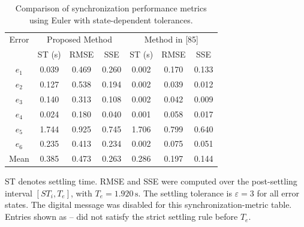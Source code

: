 \begin{table}[!t]
\centering
\caption{Comparison of synchronization performance metrics using Euler with state-dependent tolerances.}
\label{tab:t1_article_style_euler}
\renewcommand{\arraystretch}{1.15}
\begin{tabular}{c|ccc|ccc}
\hline
Error & \multicolumn{3}{c|}{Proposed Method} & \multicolumn{3}{c}{Method in [85]} \\
 & ST (s) & RMSE & SSE & ST (s) & RMSE & SSE \\
\hline
$e_1$ & 0.039 & 0.469 & 0.260 & 0.002 & 0.170 & 0.133 \\
$e_2$ & 0.127 & 0.538 & 0.194 & 0.002 & 0.039 & 0.012 \\
$e_3$ & 0.140 & 0.313 & 0.108 & 0.002 & 0.042 & 0.009 \\
$e_4$ & 0.024 & 0.180 & 0.040 & 0.001 & 0.058 & 0.017 \\
$e_5$ & 1.744 & 0.925 & 0.745 & 1.706 & 0.799 & 0.640 \\
$e_6$ & 0.235 & 0.413 & 0.234 & 0.002 & 0.075 & 0.051 \\
Mean & 0.385 & 0.473 & 0.263 & 0.286 & 0.197 & 0.144 \\
\hline
\end{tabular}

\vspace{1mm}
\begin{minipage}{0.95\linewidth}
\footnotesize
ST denotes settling time. RMSE and SSE were computed over the post-settling interval $[ST_i,T_e]$, with $T_e=1.920\,\mathrm{s}$. The settling tolerance is $\varepsilon=3$ for all error states. The digital message was disabled for this synchronization-metric table. Entries shown as -- did not satisfy the strict settling rule before $T_e$.
\end{minipage}
\end{table}
